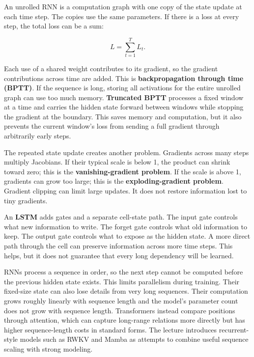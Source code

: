 \hypertarget{04-visual-computing-ii-ch031-backpropagation-through-time-shares-gradients-across-steps}{}

An unrolled RNN is a computation graph with one copy of the state update at each time step. The copies use the same parameters. If there is a loss at every step, the total loss can be a sum:

\[L=\sum_{t=1}^{T} L_t.\]

Each use of a shared weight contributes to its gradient, so the gradient contributions across time are added. This is \textbf{backpropagation through time (BPTT)}. If the sequence is long, storing all activations for the entire unrolled graph can use too much memory. \textbf{Truncated BPTT} processes a fixed window at a time and carries the hidden state forward between windows while stopping the gradient at the boundary. This saves memory and computation, but it also prevents the current window's loss from sending a full gradient through arbitrarily early steps.

The repeated state update creates another problem. Gradients across many steps multiply Jacobians. If their typical scale is below 1, the product can shrink toward zero; this is the \textbf{vanishing-gradient problem}. If the scale is above 1, gradients can grow too large; this is the \textbf{exploding-gradient problem}. Gradient clipping can limit large updates. It does not restore information lost to tiny gradients.

An \textbf{LSTM} adds gates and a separate cell-state path. The input gate controls what new information to write. The forget gate controls what old information to keep. The output gate controls what to expose as the hidden state. A more direct path through the cell can preserve information across more time steps. This helps, but it does not guarantee that every long dependency will be learned.

RNNs process a sequence in order, so the next step cannot be computed before the previous hidden state exists. This limits parallelism during training. Their fixed-size state can also lose details from very long sequences. Their computation grows roughly linearly with sequence length and the model's parameter count does not grow with sequence length. Transformers instead compare positions through attention, which can capture long-range relations more directly but has higher sequence-length costs in standard forms. The lecture introduces recurrent-style models such as RWKV and Mamba as attempts to combine useful sequence scaling with strong modeling.

